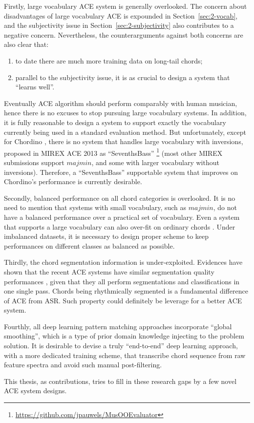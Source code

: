Firstly, large vocabulary ACE system is generally overlooked. The concern about disadvantages of large vocabulary ACE is expounded in Section~\ref{sec:2-vocab}, and the subjectivity issue in Section~\ref{sec:2-subjectivity} also contributes to a negative concern. Nevertheless, the counterarguments against both concerns are also clear that:
\begin{enumerate}
\item to date there are much more training data on long-tail chords;
\item parallel to the subjectivity issue, it is as crucial to design a system that ``learns well''.
\end{enumerate}
Eventually ACE algorithm should perform comparably with human musician, hence there is no excuses to stop pursuing large vocabulary systems. In addition, it is fully reasonable to design a system to support exactly the vocabulary currently being used in a standard evaluation method. But unfortunately, except for Chordino \cite{cannam2010sonic}, there is no system that handles large vocabulary with inversions, proposed in MIREX ACE 2013 as ``SeventhsBass'' \footnote{\url{https://github.com/jpauwels/MusOOEvaluator}} (most other MIREX submissions support $majmin$, and some with larger vocabulary without inversions). Therefore, a ``SeventhsBass'' supportable system that improves on Chordino's performance is currently desirable.

Secondly, balanced performance on all chord categories is overlooked. It is no need to mention that systems with small vocabulary, such as $majmin$, do not have a balanced performance over a practical set of vocabulary. Even a system that supports a large vocabulary can also over-fit on ordinary chords \cite{deng2016hybrid}. Under imbalanced datasets, it is necessary to design proper scheme to keep performances on different classes as balanced as possible.

Thirdly, the chord segmentation information is under-exploited. Evidences have shown that the recent ACE systems have similar segmentation quality performances \cite{burgoyne2014comparative}, given that they all perform segmentations and classifications in one single pass. Chords being rhythmically segmented is a fundamental difference of ACE from ASR. Such property could definitely be leverage for a better ACE system.

Fourthly, all deep learning pattern matching approaches incorporate ``global smoothing'', which is a type of prior domain knowledge injecting to the problem solution. It is desirable to devise a truly ``end-to-end'' deep learning approach, with a more dedicated training scheme, that transcribe chord sequence from raw feature spectra and avoid such manual post-filtering.

This thesis, as contributions, tries to fill in these research gaps by a few novel ACE system designs.

